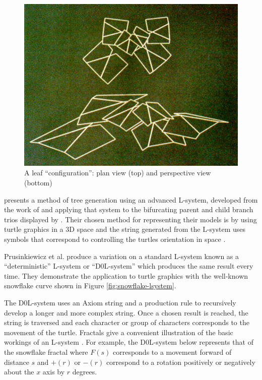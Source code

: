 \documentclass[final]{cmpreport}
\begin{document}
\begin{figure}[ht]
    \includegraphics[scale=0.24]{bloomenthal-leaves.PNG} 
    \centering
    \captionsetup{justification=centering}
    \caption{A leaf ``configuration'': plan view (top) and perspective view (bottom)}
    \label{fig:bloomenthal-leaves}
\end{figure}

\cite{prusinkiewicz1996systems} presents a method of tree generation using an advanced 
L-system, developed from the work of \cite{lindenmayer1968mathematical1} and applying 
that system to the bifurcating parent and child branch trios displayed by \cite{honda1971description}.
Their chosen method for representing their models is by using turtle graphics in a 3D 
space and the string generated from the L-system uses symbols that correspond to controlling 
the turtles orientation in space \citep{szilard1979interpretation,prusinkiewicz1986graphical}.

Prusinkiewicz et al. produce a variation on a standard L-system known as a ``deterministic''
L-system or ``D0L-system'' which produces the same result every time. They demonstrate the 
application to turtle graphics with the well-known snowflake curve \citep{mandelbrot1982fractal,koch1906methode} 
shown in Figure \ref{fig:snowflake-lsystem}.

The D0L-system uses an Axiom string and a production rule to recursively develop a longer and 
more complex string. Once a chosen result is reached, the string is traversed and each character 
or group of characters corresponds to the movement of the turtle. Fractals give a convenient 
illustration of the basic workings of an L-system \citep{prusinkiewicz1986graphical,prusinkiewicz2012algorithmic}. 
For example, the D0L-system below represents that of the snowflake fractal where $F(s)$ 
corresponds to a movement forward of distance $s$ and $+(r)$ or $-(r)$ correspond to a rotation 
positively or negatively about the $x$ axis by $r$ degrees.
\end{document}
